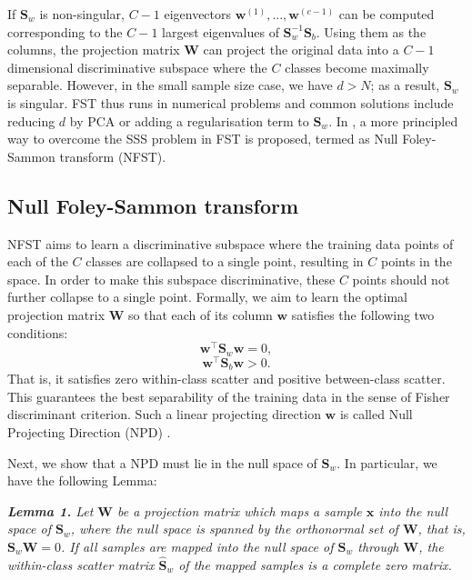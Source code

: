 \documentclass[10pt,twocolumn,letterpaper]{article}
\begin{document}
If $\mathbf{S}_{w}$ is non-singular, $C-1$ eigenvectors $\mathbf{w}^{(1)},...,\mathbf{w}^{(c-1)}$ can be computed corresponding to the $C-1$ largest eigenvalues of $\mathbf{S}_{w}^{-1}\mathbf{S}_{b}$. Using them as the columns, the projection matrix  $\mathbf{W}$ can project the original data into a $C-1$ dimensional  discriminative subspace where the $C$ classes become maximally separable. However, in the small sample size case, we have $d>N$; as a result, $\mathbf{S}_{w}$ is singular. FST thus runs in numerical problems and common solutions include reducing $d$ by PCA or adding a regularisation term to $\mathbf{S}_{w}$. In \cite{guo2006null}, a more principled way to overcome the SSS problem in FST is proposed, termed as  Null  Foley-Sammon transform (NFST).



\subsection{Null Foley-Sammon transform}


NFST aims to learn a discriminative subspace where the training data points of each of the $C$ classes are collapsed to a single point, resulting in $C$ points in the space. In order to make this subspace discriminative, these $C$ points should not further collapse to a single point. Formally, we aim to learn the optimal projection matrix $\mathbf{W}$ so that each of its column $\mathbf{w}$ satisfies the following two conditions: 
\begin{equation}\label{fisher0} 
\mathbf{w}^{\top}\mathbf{S}_{w} \mathbf{w} = 0,
\end{equation}
\begin{equation}\label{fisher1} 
\mathbf{w}^{\top}\mathbf{S}_{b} \mathbf{w} > 0.
\end{equation}
That is, it satisfies zero within-class scatter and positive between-class scatter. This guarantees the best separability of the training data in the sense of  
Fisher discriminant criterion.  Such a linear projecting direction $\mathbf{w}$ is called Null Projecting Direction (NPD) \cite{guo2006null}.

Next, we show that a NPD must lie in the null space of $\mathbf{S}_{w}$. In particular, we have the following Lemma:

\emph{\textbf{Lemma 1.} Let $\mathbf{W}$ be a projection matrix which maps a sample $\mathbf{x}$  into the null space of $\mathbf{S}_{w}$, where the null space is spanned by the orthonormal set of $\mathbf{W}$, that is,  $\mathbf{S}_{w}\mathbf{W} = 0$. If all samples are mapped into the null space of $\mathbf{S}_{w}$ through $\mathbf{W}$, the within-class scatter matrix $\widehat{\mathbf{S}}_{w}$ of the mapped samples is a complete zero matrix.}
\end{document}
